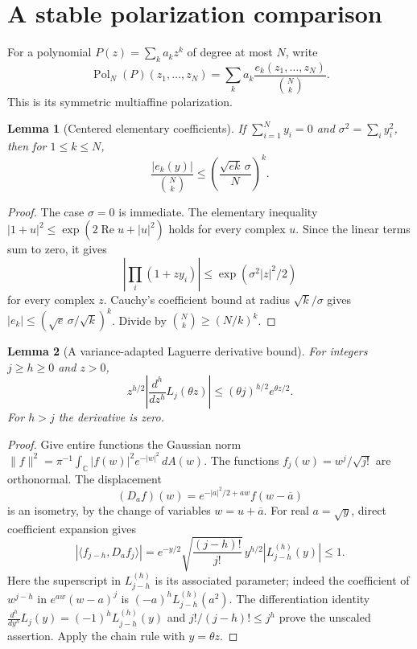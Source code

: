 \documentclass[11pt]{article}
\newtheorem{lemma}{Lemma}
\newcommand{\Pol}{\operatorname{Pol}}
\begin{document}
\section*{A stable polarization comparison}
For a polynomial $P(z)=\sum_k a_kz^k$ of degree at most $N$, write
\[
 \Pol_N(P)(z_1,\ldots,z_N)
    =\sum_k a_k\frac{e_k(z_1,\ldots,z_N)}{\binom Nk}.
\]
This is its symmetric multiaffine polarization.

\begin{lemma}[Centered elementary coefficients]\label{elementary}
If $\sum_{i=1}^Ny_i=0$ and $\sigma^2=\sum_i y_i^2$, then for
$1\le k\le N$,
\[
 \frac{|e_k(y)|}{\binom Nk}
       \le \left(\frac{\sqrt{e k}\,\sigma}{N}\right)^k.
\]
\end{lemma}
\begin{proof}
The case $\sigma=0$ is immediate. The elementary inequality
$|1+u|^2\le\exp(2\operatorname{Re}u+|u|^2)$ holds for every complex $u$.
Since the linear terms sum to zero, it gives
\[
 \left|\prod_i(1+zy_i)\right|\le\exp(\sigma^2|z|^2/2)
\]
for every complex $z$. Cauchy's coefficient bound at radius
$\sqrt{k}/\sigma$ gives $|e_k|\le(\sqrt e\,\sigma/\sqrt k)^k$.
Divide by $\binom Nk\ge(N/k)^k$.
\end{proof}

\begin{lemma}[A variance-adapted Laguerre derivative bound]\label{lagderiv}
For integers $j\ge h\ge0$ and $z>0$,
\[
 z^{h/2}\left|\frac{d^h}{dz^h}L_j(\theta z)\right|
       \le(\theta j)^{h/2}e^{\theta z/2}.
\]
For $h>j$ the derivative is zero.
\end{lemma}
\begin{proof}
Give entire functions the Gaussian norm
$\|f\|^2=\pi^{-1}\int_{\mathbb C}|f(w)|^2e^{-|w|^2}\,dA(w)$.
The functions $f_j(w)=w^j/\sqrt{j!}$ are orthonormal. The displacement
\[
 (D_af)(w)=e^{-|a|^2/2+aw}f(w-\overline a)
\]
is an isometry, by the change of variables $w=u+\overline a$.
For real $a=\sqrt y$, direct coefficient expansion gives
\[
 \left|\langle f_{j-h},D_af_j\rangle\right|
   =e^{-y/2}\sqrt{\frac{(j-h)!}{j!}}\,
            y^{h/2}\left|L_{j-h}^{(h)}(y)\right|\le1.
\]
Here the superscript in $L_{j-h}^{(h)}$ is its associated parameter;
indeed the coefficient of $w^{j-h}$ in $e^{aw}(w-a)^j$ is
$(-a)^h L_{j-h}^{(h)}(a^2)$.
The differentiation identity
$\frac{d^h}{dy^h}L_j(y)=(-1)^hL_{j-h}^{(h)}(y)$ and
$j!/(j-h)!\le j^h$ prove the unscaled assertion.
Apply the chain rule with $y=\theta z$.
\end{proof}
\end{document}
